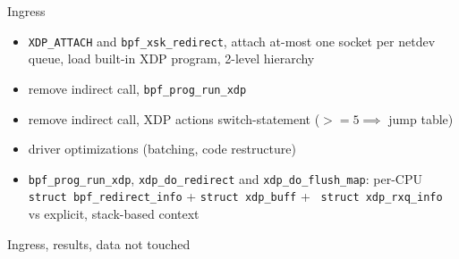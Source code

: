 \documentclass{beamer}
\begin{document}
  \begin{frame}{Ingress}
      \begin{itemize}
        \item {\tt XDP\_ATTACH} and {\tt bpf\_xsk\_redirect}, attach
          at-most one socket per netdev queue, load built-in XDP
          program, 2-level hierarchy
        \item remove indirect call, {\tt bpf\_prog\_run\_xdp}
        \item remove indirect call, XDP actions switch-statement ($>=5
          \implies$ jump table)
        \item driver optimizations (batching, code restructure)
        \item {\tt bpf\_prog\_run\_xdp}, {\tt xdp\_do\_redirect} and
          {\tt xdp\_do\_flush\_map}: per-CPU {\tt struct
            bpf\_redirect\_info} + {\tt struct xdp\_buff} + {\tt
            struct xdp\_rxq\_info} vs explicit, stack-based context
      \end{itemize}
  \end{frame}
  \begin{frame}{Ingress, results, data not touched}
  \end{frame}
\end{document}
